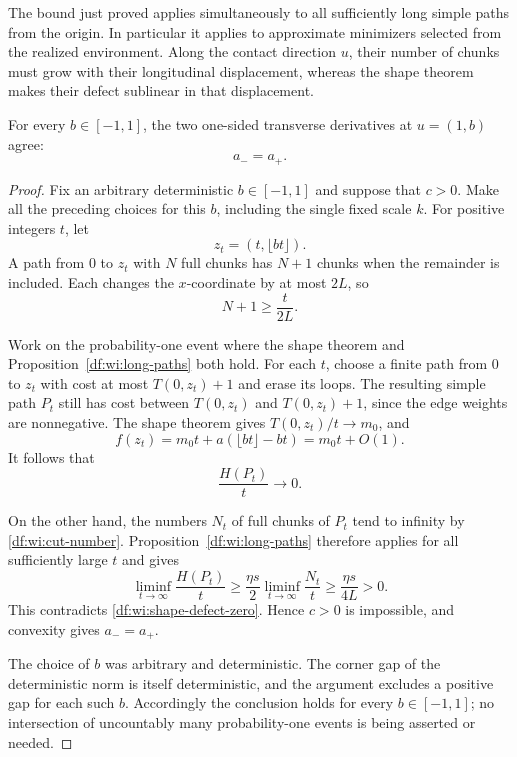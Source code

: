 The bound just proved applies simultaneously to all sufficiently long
simple paths from the origin. In particular it applies to approximate
minimizers selected from the realized environment. Along the contact
direction $u$, their number of chunks must grow with their longitudinal
displacement, whereas the shape theorem makes their defect sublinear in
that displacement.

\begin{proposition}
\label{df:wi:no-corner}
For every $b\in[-1,1]$, the two one-sided transverse derivatives at
$u=(1,b)$ agree:
\[
  a_-=a_+.
\]
\end{proposition}

\begin{proof}
Fix an arbitrary deterministic $b\in[-1,1]$ and suppose that $c>0$.
Make all the preceding choices for this $b$, including the single fixed
scale $k$.  For positive integers $t$, let
\[
  z_t=(t,\lfloor bt\rfloor).
\]
A path from $0$ to $z_t$ with $N$ full chunks has $N+1$ chunks when the
remainder is included.  Each changes the $x$-coordinate by at most $2L$,
so
\begin{equation}
\label{df:wi:cut-number}
  N+1\ge\frac{t}{2L}.
\end{equation}

Work on the probability-one event where the shape theorem and
Proposition~\ref{df:wi:long-paths} both hold.  For each $t$, choose a finite
path from $0$ to $z_t$ with cost at most $T(0,z_t)+1$ and erase its loops.
The resulting simple path $P_t$ still has cost between $T(0,z_t)$ and
$T(0,z_t)+1$, since the edge weights are nonnegative.  The shape theorem
gives $T(0,z_t)/t\to m_0$, and
\[
  f(z_t)=m_0t+a(\lfloor bt\rfloor-bt)=m_0t+O(1).
\]
It follows that
\begin{equation}
\label{df:wi:shape-defect-zero}
  \frac{H(P_t)}{t}\longrightarrow0.
\end{equation}

On the other hand, the numbers $N_t$ of full chunks of $P_t$ tend to
infinity by \eqref{df:wi:cut-number}.  Proposition~\ref{df:wi:long-paths}
therefore applies for all sufficiently large $t$ and gives
\[
  \liminf_{t\to\infty}\frac{H(P_t)}t
  \ge\frac{\eta s}{2}
       \liminf_{t\to\infty}\frac{N_t}{t}
  \ge\frac{\eta s}{4L}>0.
\]
This contradicts \eqref{df:wi:shape-defect-zero}.  Hence $c>0$ is impossible,
and convexity gives $a_-=a_+$.

The choice of $b$ was arbitrary and deterministic.  The corner gap of the
deterministic norm is itself deterministic, and the argument excludes a
positive gap for each such $b$.  Accordingly the conclusion holds for
every $b\in[-1,1]$; no intersection of uncountably many probability-one
events is being asserted or needed.
\end{proof}
